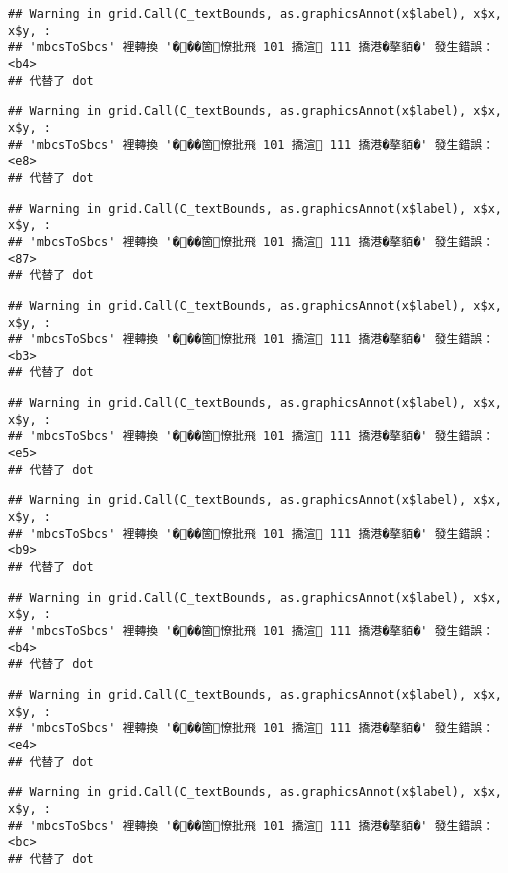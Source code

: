 \documentclass[
]{article}
\begin{document}
\begin{verbatim}
## Warning in grid.Call(C_textBounds, as.graphicsAnnot(x$label), x$x, x$y, :
## 'mbcsToSbcs' 裡轉換 '���箇憭批飛 101 撟渲 111 撟港�摮貊�' 發生錯誤：<b4>
## 代替了 dot
\end{verbatim}

\begin{verbatim}
## Warning in grid.Call(C_textBounds, as.graphicsAnnot(x$label), x$x, x$y, :
## 'mbcsToSbcs' 裡轉換 '���箇憭批飛 101 撟渲 111 撟港�摮貊�' 發生錯誤：<e8>
## 代替了 dot
\end{verbatim}

\begin{verbatim}
## Warning in grid.Call(C_textBounds, as.graphicsAnnot(x$label), x$x, x$y, :
## 'mbcsToSbcs' 裡轉換 '���箇憭批飛 101 撟渲 111 撟港�摮貊�' 發生錯誤：<87>
## 代替了 dot
\end{verbatim}

\begin{verbatim}
## Warning in grid.Call(C_textBounds, as.graphicsAnnot(x$label), x$x, x$y, :
## 'mbcsToSbcs' 裡轉換 '���箇憭批飛 101 撟渲 111 撟港�摮貊�' 發生錯誤：<b3>
## 代替了 dot
\end{verbatim}

\begin{verbatim}
## Warning in grid.Call(C_textBounds, as.graphicsAnnot(x$label), x$x, x$y, :
## 'mbcsToSbcs' 裡轉換 '���箇憭批飛 101 撟渲 111 撟港�摮貊�' 發生錯誤：<e5>
## 代替了 dot
\end{verbatim}

\begin{verbatim}
## Warning in grid.Call(C_textBounds, as.graphicsAnnot(x$label), x$x, x$y, :
## 'mbcsToSbcs' 裡轉換 '���箇憭批飛 101 撟渲 111 撟港�摮貊�' 發生錯誤：<b9>
## 代替了 dot
\end{verbatim}

\begin{verbatim}
## Warning in grid.Call(C_textBounds, as.graphicsAnnot(x$label), x$x, x$y, :
## 'mbcsToSbcs' 裡轉換 '���箇憭批飛 101 撟渲 111 撟港�摮貊�' 發生錯誤：<b4>
## 代替了 dot
\end{verbatim}

\begin{verbatim}
## Warning in grid.Call(C_textBounds, as.graphicsAnnot(x$label), x$x, x$y, :
## 'mbcsToSbcs' 裡轉換 '���箇憭批飛 101 撟渲 111 撟港�摮貊�' 發生錯誤：<e4>
## 代替了 dot
\end{verbatim}

\begin{verbatim}
## Warning in grid.Call(C_textBounds, as.graphicsAnnot(x$label), x$x, x$y, :
## 'mbcsToSbcs' 裡轉換 '���箇憭批飛 101 撟渲 111 撟港�摮貊�' 發生錯誤：<bc>
## 代替了 dot
\end{verbatim}
\end{document}
